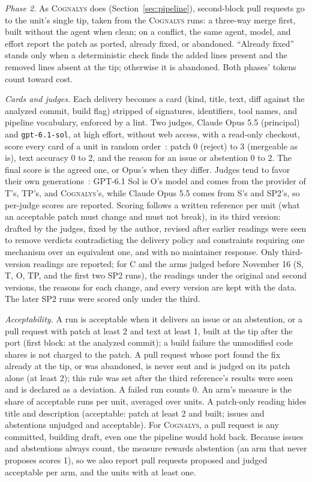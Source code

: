 \documentclass[conference]{IEEEtran}
\newcommand{\system}{\textsc{Cognalys}}
\begin{document}
\emph{Phase 2.} As {\system} does (Section~\ref{sec:pipeline}), second-block
pull requests go to the unit's single tip, taken from the {\system} runs: a
three-way merge first, built without the agent when clean; on a conflict, the
same agent, model, and effort report the patch as ported, already fixed, or
abandoned. ``Already fixed'' stands only when a deterministic check finds the
added lines present and the removed lines absent at the tip; otherwise it is
abandoned. Both phases' tokens count toward cost.

\emph{Cards and judges.} Each delivery becomes a card (kind, title, text,
diff against the analyzed commit, build flag) stripped of signatures,
identifiers, tool names, and pipeline vocabulary, enforced by a lint. Two
judges, Claude Opus 5.5 (principal) and \texttt{gpt-6.1-sol}, at high effort,
without web access, with a read-only checkout, score every card of a unit in
random order~\cite{wang2024fair}: patch 0 (reject) to 3 (mergeable as is),
text accuracy 0 to 2, and the reason for an issue or abstention 0 to 2. The
final score is the agreed one, or Opus's when they differ. Judges tend to
favor their own generations~\cite{panickssery2024selfpref}: GPT-6.1 Sol is
O's model and comes from the provider of T's, TP's, and {\system}'s, while
Claude Opus 5.5 comes from S's and SP2's, so per-judge scores are reported. Scoring follows a
written reference per unit (what an acceptable patch must change and must not
break), in its third version: drafted by the judges, fixed by the author,
revised after earlier readings were seen to remove verdicts contradicting the
delivery policy and constraints requiring one mechanism over an equivalent
one, and with no maintainer response. Only third-version readings are
reported; for C and the arms judged before November 16 (S, T, O, TP, and the
first two SP2 runs), the readings under the original and second versions, the
reasons for each change, and every version are kept with the data. The later
SP2 runs were scored only under the third.

\emph{Acceptability.} A run is acceptable when it delivers an issue or an
abstention, or a pull request with patch at least 2 and text at least 1,
built at the tip after the port (first block: at the analyzed commit); a
build failure the unmodified code shares is not charged to the patch. A pull
request whose port found the fix already at the tip, or was abandoned, is
never sent and is judged on its patch alone (at least 2); this rule was set
after the third reference's results were seen and is declared as a deviation.
A failed run counts 0. An arm's measure is the share of acceptable runs per
unit, averaged over units. A patch-only reading hides title and description
(acceptable: patch at least 2 and built; issues and abstentions unjudged and
acceptable). For {\system}, a pull request is any committed, building draft,
even one the pipeline would hold back. Because issues and abstentions always
count, the measure rewards abstention (an arm that never proposes scores 1),
so we also report pull requests proposed and judged acceptable per arm, and
the units with at least one.
\end{document}
